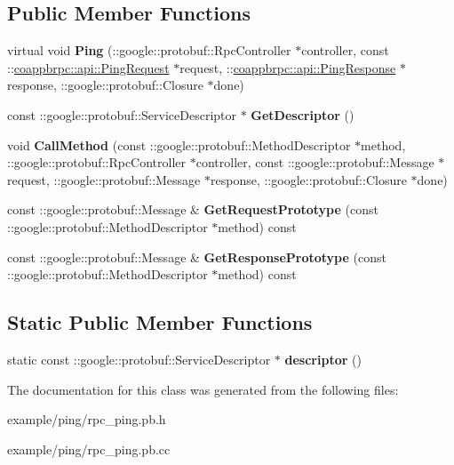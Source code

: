\subsection*{Public Member Functions}
\begin{DoxyCompactItemize}
\item 
\mbox{\label{classcoappbrpc_1_1api_1_1PingService_a361e1596dc11ab6258367685fcc8f156}} 
virtual void {\bfseries Ping} (\+::google\+::protobuf\+::\+Rpc\+Controller $\ast$controller, const \+::\hyperlink{classcoappbrpc_1_1api_1_1PingRequest}{coappbrpc\+::api\+::\+Ping\+Request} $\ast$request, \+::\hyperlink{classcoappbrpc_1_1api_1_1PingResponse}{coappbrpc\+::api\+::\+Ping\+Response} $\ast$response, \+::google\+::protobuf\+::\+Closure $\ast$done)
\item 
\mbox{\label{classcoappbrpc_1_1api_1_1PingService_ad1239eb175e0167a0ededb8c97138da4}} 
const \+::google\+::protobuf\+::\+Service\+Descriptor $\ast$ {\bfseries Get\+Descriptor} ()
\item 
\mbox{\label{classcoappbrpc_1_1api_1_1PingService_a54cc017d8ca0ff36772a2de9ee27af23}} 
void {\bfseries Call\+Method} (const \+::google\+::protobuf\+::\+Method\+Descriptor $\ast$method, \+::google\+::protobuf\+::\+Rpc\+Controller $\ast$controller, const \+::google\+::protobuf\+::\+Message $\ast$request, \+::google\+::protobuf\+::\+Message $\ast$response, \+::google\+::protobuf\+::\+Closure $\ast$done)
\item 
\mbox{\label{classcoappbrpc_1_1api_1_1PingService_a7e8ace36863458182c8234ecd696a724}} 
const \+::google\+::protobuf\+::\+Message \& {\bfseries Get\+Request\+Prototype} (const \+::google\+::protobuf\+::\+Method\+Descriptor $\ast$method) const
\item 
\mbox{\label{classcoappbrpc_1_1api_1_1PingService_a0ba080d1cf53037de978913c60291128}} 
const \+::google\+::protobuf\+::\+Message \& {\bfseries Get\+Response\+Prototype} (const \+::google\+::protobuf\+::\+Method\+Descriptor $\ast$method) const
\end{DoxyCompactItemize}
\subsection*{Static Public Member Functions}
\begin{DoxyCompactItemize}
\item 
\mbox{\label{classcoappbrpc_1_1api_1_1PingService_acc42ce58d50975cacd3ef40683c77d98}} 
static const \+::google\+::protobuf\+::\+Service\+Descriptor $\ast$ {\bfseries descriptor} ()
\end{DoxyCompactItemize}


The documentation for this class was generated from the following files\+:\begin{DoxyCompactItemize}
\item 
example/ping/rpc\+\_\+ping.\+pb.\+h\item 
example/ping/rpc\+\_\+ping.\+pb.\+cc\end{DoxyCompactItemize}
